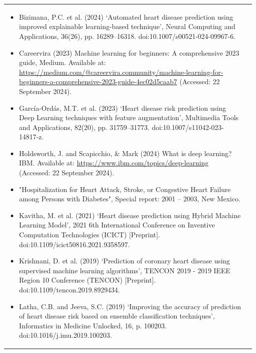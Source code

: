 \begin{longtable}{|p{4cm}|p{11cm}|}
\begin{itemize}
    \item Bizimana, P.C. et al. (2024) ‘Automated heart disease prediction using improved explainable learning-based technique’, Neural Computing and Applications, 36(26), pp. 16289–16318. doi:10.1007/s00521-024-09967-6.
    
    \item Careervira (2023) Machine learning for beginners: A comprehensive 2023 guide, Medium. Available at: \url{https://medium.com/@careervira.community/machine-learning-for-beginners-a-comprehensive-2023-guide-4ec02d5caab7} (Accessed: 22 September 2024).
    
    \item García-Ordás, M.T. et al. (2023) ‘Heart disease risk prediction using Deep Learning techniques with feature augmentation’, Multimedia Tools and Applications, 82(20), pp. 31759–31773. doi:10.1007/s11042-023-14817-z.
    
    \item Holdsworth, J. and Scapicchio, \& Mark (2024) What is deep learning? IBM. Available at: \url{https://www.ibm.com/topics/deep-learning} (Accessed: 22 September 2024).
    
    \item "Hospitalization for Heart Attack, Stroke, or Congestive Heart Failure among Persons with Diabetes", Special report: 2001 – 2003, New Mexico.
    
    \item Kavitha, M. et al. (2021) ‘Heart disease prediction using Hybrid Machine Learning Model’, 2021 6th International Conference on Inventive Computation Technologies (ICICT) [Preprint]. doi:10.1109/icict50816.2021.9358597.
    
    \item Krishnani, D. et al. (2019) ‘Prediction of coronary heart disease using supervised machine learning algorithms’, TENCON 2019 - 2019 IEEE Region 10 Conference (TENCON) [Preprint]. doi:10.1109/tencon.2019.8929434.
    
    \item Latha, C.B. and Jeeva, S.C. (2019) ‘Improving the accuracy of prediction of heart disease risk based on ensemble classification techniques’, Informatics in Medicine Unlocked, 16, p. 100203. doi:10.1016/j.imu.2019.100203.
\end{itemize}
\hline


\end{longtable}
